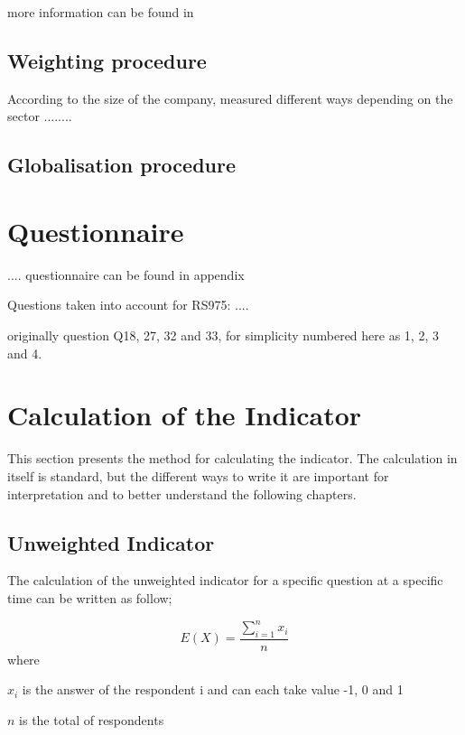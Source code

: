 \documentclass[12pt,a4paper,oneside]{book}
\begin{document}
more information can be found in \cite{de_greef_national_2009}


\subsection{Weighting procedure}

According to the size of the company, measured different ways depending on the sector ........

\subsection{Globalisation procedure}



\section{Questionnaire}
.... questionnaire can be found in appendix %


Questions taken into account for RS975:
....

originally question Q18, 27, 32 and 33, for simplicity numbered here as 1, 2, 3 and 4.


\newpage

\section{Calculation of the Indicator}

This section presents the method for calculating the indicator. 
The calculation in itself is standard, but the different ways to write it are important for interpretation and to better understand the following chapters.

\subsection{Unweighted Indicator}

The calculation of the unweighted indicator for a specific question at a specific time can be written as follow;

\begin{equation}
    E(X) = \frac{ \sum_{i=1}^n x_i}{n}
\end{equation} 
where 

$x_i$ is the answer of the respondent i and can each take value -1, 0 and 1 

$n$ is the total of respondents \\
\end{document}
